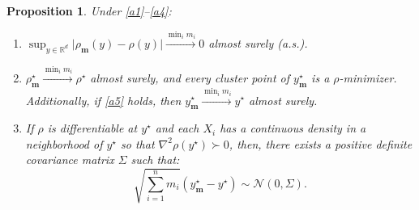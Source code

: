 \documentclass[letter,11pt, reqno]{amsart}
\newcommand{\R}{\mathbb{R}}
\newcommand{\dsup}{\displaystyle\sup}
\renewcommand{\;}{\quad}
\theoremstyle{thmstyleone}%
\newtheorem{proposition}[theorem]{Proposition}%
\theoremstyle{thmstyletwo}%
\theoremstyle{thmstylethree}%
\begin{document}
\begin{proposition}\label{lem:ULLN}
Under \ref{a1}--\ref{a4}:
\begin{enumerate}
    \item $\dsup_{y\in\R^d}\big|\rho_\mathbf{m}(y)-\rho(y)\big|\xrightarrow{\min_i m_i} 0$ almost surely (a.s.). \label{prop:convergency1}
    \item $\rho^\star_\mathbf{m}\xrightarrow{\min_i m_i} \rho^\star$ almost surely, and every cluster point of $y^\star_{\mathbf{m}}$ is a $\rho$-minimizer. Additionally, if \ref{a5} holds, then $y^\star_{\mathbf{m}}\xrightarrow{\min_i m_i} y^\star$ almost surely.\label{prop:convergency2}
    \item If $\rho$ is differentiable at $y^\star$ and each $X_i$ has a continuous density in a neighborhood of $y^\star$ so that $\nabla^2\rho(y^\star)\succ0$, then, there exists a positive definite covariance matrix $\Sigma$ such that:
\begin{equation*}
    \sqrt{\sum_{i=1}^n m_i}(y^\star_{\mathbf m}-y^\star)\sim\mathcal N(0,\Sigma).
\end{equation*}
\label{prop:convergency3}
\end{enumerate}
\end{proposition}
\end{document}
